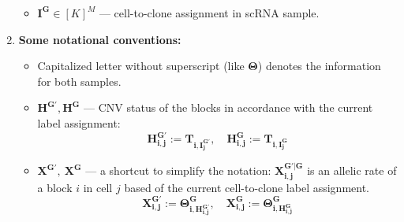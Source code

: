 \documentclass[11pt,a4paper,fullpage]{article}
\theoremstyle{definition}
\theoremstyle{definition}
\theoremstyle{definition}
\numberwithin{equation}{section}
\begin{document}
\begin{enumerate}
\begin{itemize}
			\item $ \mathbf{I^{G}} \in [K]^{M} $ — cell-to-clone assignment in scRNA sample.
		\end{itemize}
		\item \textbf{Some notational conventions:}
		\begin{itemize}
			\item Capitalized letter without superscript (like $ \mathbf{\Theta} $) denotes the information for both samples.
			\item $ \mathbf{H^{G'}}, \mathbf{H^{G}} $ — CNV status of the blocks in accordance with the current label assignment: 
			$$ 
			\mathbf{H^{G'}_{i,j}} := \mathbf{T_{i, I^{G'}_{j}}},\quad \mathbf{H^{G}_{i,j}} := \mathbf{T_{i, I^{G}_{j}}}
			$$
			\item  $ \mathbf{X^{G'}},\ \mathbf{X^{G}} $ — a shortcut to simplify the notation: $\mathbf{X^{G'|G}_{i,j}}$ is an allelic rate of a block $ i $ in cell $ j $ based of the current cell-to-clone label assignment.
			$$ 
			\mathbf{X^{G'}_{i,j}} := \mathbf{\Theta^{G}_{i, H^{G'}_{i,j}}},\quad \mathbf{X^{G}_{i,j}} := \mathbf{\Theta^{G}_{i, H^{G}_{i,j}}} 
			$$
		\end{itemize}
	\end{enumerate}
\end{document}
